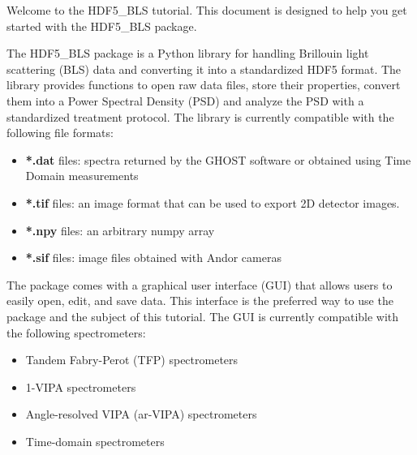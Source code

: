 Welcome to the HDF5\_BLS tutorial. This document is designed to help you get started with the HDF5\_BLS package.

The HDF5\_BLS package is a Python library for handling Brillouin light scattering (BLS) data and converting it into a standardized HDF5 format. The library provides functions to open raw data files, store their properties, convert them into a Power Spectral Density (PSD) and analyze the PSD with a standardized treatment protocol. The library is currently compatible with the following file formats:
\begin{itemize}
    \item \textbf{*.dat} files: spectra returned by the GHOST software or obtained using Time Domain measurements
    \item \textbf{*.tif} files: an image format that can be used to export 2D detector images.
    \item \textbf{*.npy} files: an arbitrary numpy array
    \item \textbf{*.sif} files: image files obtained with Andor cameras
\end{itemize}

The package comes with a graphical user interface (GUI) that allows users to easily open, edit, and save data. This interface is the preferred way to use the package and the subject of this tutorial. The GUI is currently compatible with the following spectrometers:
\begin{itemize}
    \item Tandem Fabry-Perot (TFP) spectrometers
    \item 1-VIPA spectrometers
    \item Angle-resolved VIPA (ar-VIPA) spectrometers 
    \item Time-domain spectrometers
\end{itemize}